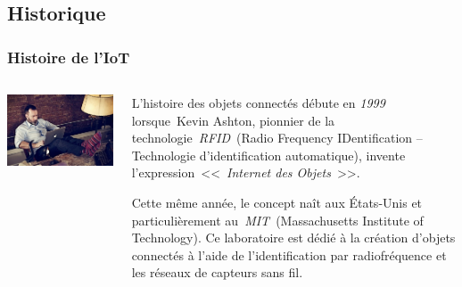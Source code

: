 \documentclass[aspectratio=169,utf8,french]{beamer}
\begin{document}
\subsection{Historique}

\begin{frame}
  \frametitle{Histoire de l'IoT}
  \begin{columns}
    \begin{column}{.3\textwidth}
      \includegraphics[width=\textwidth]{pictures/kevinashton.jpg}
    \end{column}
    \begin{column}{.7\textwidth}
      L’histoire des objets connectés débute en \emph{1999} lorsque Kevin Ashton, pionnier de la technologie \emph{RFID} (Radio Frequency IDentification – Technologie d’identification automatique), invente l’expression <<~\emph{Internet des Objets}~>>.

      Cette même année, le concept naît aux États-Unis et particulièrement au \emph{MIT} (Massachusetts Institute of Technology).
      Ce laboratoire est dédié à la création d’objets connectés à l’aide de l’identification par radiofréquence et les réseaux de capteurs sans fil.
    \end{column}
  \end{columns}
\end{frame}
\end{document}
